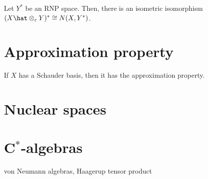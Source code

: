 \documentclass{../../small}
\begin{document}
\begin{prb}
Let $Y^*$ be an RNP space.
Then, there is an isometric isomorphism $(X\hat\otimes_\e Y)^*\cong N(X,Y^*)$.
\end{prb}

\section{Approximation property}

\begin{prb}
\end{prb}

\begin{prb}
\end{prb}

\begin{prb}
\end{prb}

\begin{prb}
\begin{parts}
\item If $X$ has a Schauder basis, then it has the approximation property.
\end{parts}
\end{prb}



\section{Nuclear spaces}


\section{C$^*$-algebras}


von Neumann algebras, Haagerup tensor product
\end{document}
